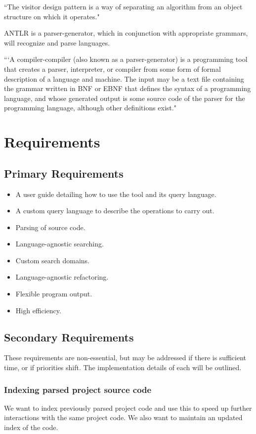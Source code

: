 \documentclass[12pt, letterpaper]{article}
\begin{document}
``The visitor design pattern is a way of separating an algorithm from an object structure on which it operates." \autocite{wikipediavisitorpattern}

ANTLR is a parser-generator, which in conjunction with appropriate grammars, will recognize and parse languages.

```A compiler-compiler (also known as a parser-generator) is a programming tool that creates a parser, interpreter, or compiler from some form of formal description of a language and machine. The input may be a text file containing the grammar written in BNF or EBNF that defines the syntax of a programming language, and whose generated output is some source code of the parser for the programming language, although other definitions exist." \autocite{wikipediacompilercompiler}

\section{Requirements}
\subsection{Primary Requirements}
\begin{itemize}
    \item A user guide detailing how to use the tool and its query language.
    \item A custom query language to describe the operations to carry out.
    \item Parsing of source code.
    \item Language-agnostic searching.
    \item Custom search domains.
    \item Language-agnostic refactoring.
    \item Flexible program output.
    \item High efficiency.
\end{itemize}

\subsection{Secondary Requirements}
These requirements are non-essential, but may be addressed if there is sufficient time, or if priorities shift.
The implementation details of each will be outlined.

\subsubsection{Indexing parsed project source code}
We want to index previously parsed project code and use this to speed up further interactions with the same project code.
We also want to maintain an updated index of the code.
\end{document}
